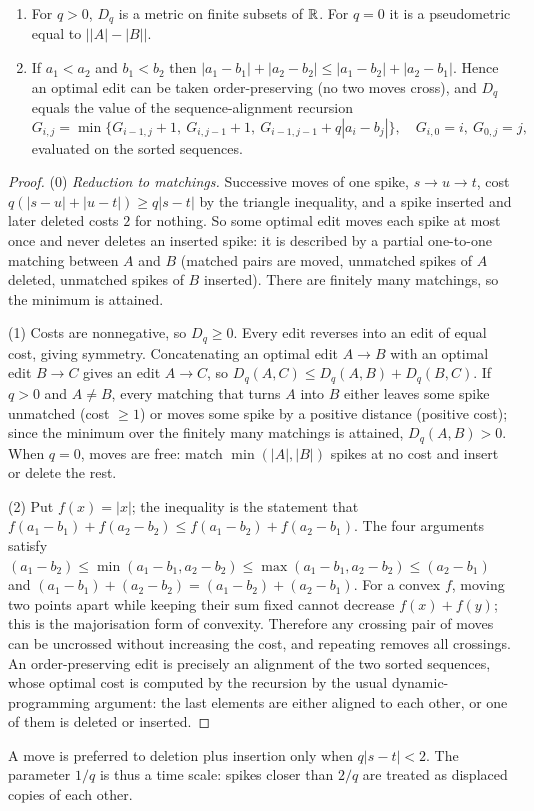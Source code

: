 \begin{theorem}\label{ars:count-008}
\begin{enumerate}[leftmargin=2em]
\item For $q>0$, $D_q$ is a metric on finite subsets of $\mathbb R$. For $q=0$ it is a pseudometric equal to $\bigl||A|-|B|\bigr|$.
\item If $a_1<a_2$ and $b_1<b_2$ then $|a_1-b_1|+|a_2-b_2|\le|a_1-b_2|+|a_2-b_1|$. Hence an optimal edit can be taken order-preserving (no two moves cross), and $D_q$ equals the value of the sequence-alignment recursion
\[G_{i,j}=\min\{G_{i-1,j}+1,\ G_{i,j-1}+1,\ G_{i-1,j-1}+q|a_i-b_j|\},\quad G_{i,0}=i,\ G_{0,j}=j,\]
evaluated on the sorted sequences.
\end{enumerate}
\end{theorem}
\begin{proof}
(0) \emph{Reduction to matchings.} Successive moves of one spike, $s\to u\to t$, cost $q(|s-u|+|u-t|)\ge q|s-t|$ by the triangle inequality, and a spike inserted and later deleted costs $2$ for nothing. So some optimal edit moves each spike at most once and never deletes an inserted spike: it is described by a partial one-to-one matching between $A$ and $B$ (matched pairs are moved, unmatched spikes of $A$ deleted, unmatched spikes of $B$ inserted). There are finitely many matchings, so the minimum is attained.

(1) Costs are nonnegative, so $D_q\ge0$. Every edit reverses into an edit of equal cost, giving symmetry. Concatenating an optimal edit $A\to B$ with an optimal edit $B\to C$ gives an edit $A\to C$, so $D_q(A,C)\le D_q(A,B)+D_q(B,C)$. If $q>0$ and $A\ne B$, every matching that turns $A$ into $B$ either leaves some spike unmatched (cost $\ge1$) or moves some spike by a positive distance (positive cost); since the minimum over the finitely many matchings is attained, $D_q(A,B)>0$. When $q=0$, moves are free: match $\min(|A|,|B|)$ spikes at no cost and insert or delete the rest.

(2) Put $f(x)=|x|$; the inequality is the statement that $f(a_1-b_1)+f(a_2-b_2)\le f(a_1-b_2)+f(a_2-b_1)$. The four arguments satisfy $(a_1-b_2)\le\min(a_1-b_1,a_2-b_2)\le\max(a_1-b_1,a_2-b_2)\le(a_2-b_1)$ and $(a_1-b_1)+(a_2-b_2)=(a_1-b_2)+(a_2-b_1)$. For a convex $f$, moving two points apart while keeping their sum fixed cannot decrease $f(x)+f(y)$; this is the majorisation form of convexity. Therefore any crossing pair of moves can be uncrossed without increasing the cost, and repeating removes all crossings. An order-preserving edit is precisely an alignment of the two sorted sequences, whose optimal cost is computed by the recursion by the usual dynamic-programming argument: the last elements are either aligned to each other, or one of them is deleted or inserted.
\end{proof}
\begin{remark}
A move is preferred to deletion plus insertion only when $q|s-t|<2$. The parameter $1/q$ is thus a time scale: spikes closer than $2/q$ are treated as displaced copies of each other.
\end{remark}

